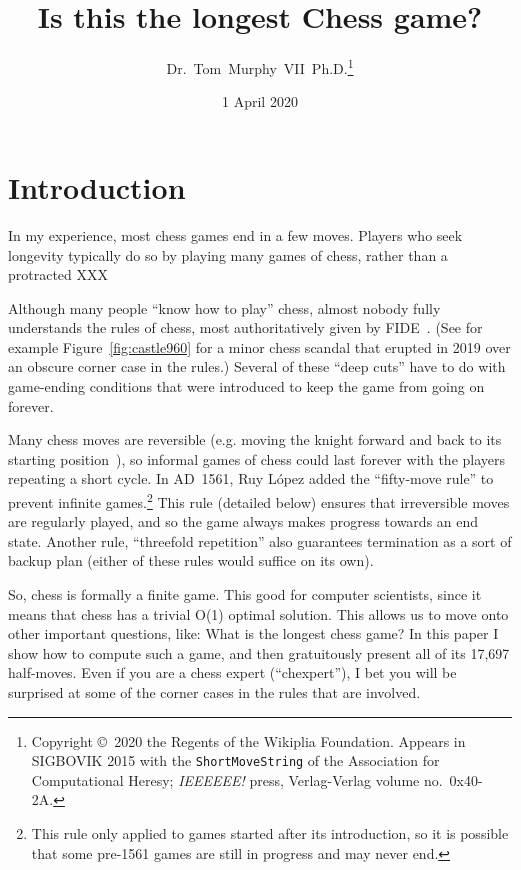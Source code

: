 \documentclass[twocolumn]{article}
\begin{document}
 

\title{Is this the longest Chess game?}
\author{Dr.~Tom~Murphy~VII~Ph.D.\thanks{
Copyright \copyright\ 2020 the Regents of the Wikiplia
Foundation. Appears in SIGBOVIK 2015 with the {\tt ShortMoveString} of the
Association for Computational Heresy; {\em IEEEEEE!} press,
Verlag-Verlag volume no.~0x40-2A.
}
}

\renewcommand\>{$>$}
\newcommand\<{$<$}

\date{1 April 2020}

\maketitle

\section{Introduction}

In my experience, most chess games end in a few moves. Players who
seek longevity typically do so by playing many games of chess, rather
than a protracted XXX


Although many people ``know how to play'' chess, almost nobody fully
understands the rules of chess, most authoritatively given by
FIDE~\cite{fiderules}. (See for example Figure~\ref{fig:castle960} for
a minor chess scandal that erupted in 2019 over an obscure corner case
in the rules.) Several of these ``deep cuts'' have to do with game-ending
conditions that were introduced to keep the game from going on forever.

Many chess moves are reversible (e.g. moving the knight forward and
back to its starting position~\cite{survival}), so informal games of
chess could last forever with the players repeating a short cycle. In
AD~1561, Ruy L\'opez added the ``fifty-move rule'' to prevent infinite
games.\footnote{This rule only applied to games started after its
  introduction, so it is possible that some pre-1561 games are still
  in progress and may never end.} This rule (detailed below) ensures
that irreversible moves are regularly played, and so the game always
makes progress towards an end state. Another rule, ``threefold
repetition'' also guarantees termination as a sort of backup plan
(either of these rules would suffice on its own).

So, chess is formally a finite game. This good for computer
scientists, since it means that chess has a trivial O(1) optimal
solution. This allows us to move onto other important questions, like:
What is the longest chess game? In this paper I show how to compute
such a game, and then gratuitously present all of its
17,697 
%
half-moves. Even if you are a chess expert (``chexpert''), I bet you
will be surprised at some of the corner cases in the rules that are
involved.
\end{document}
